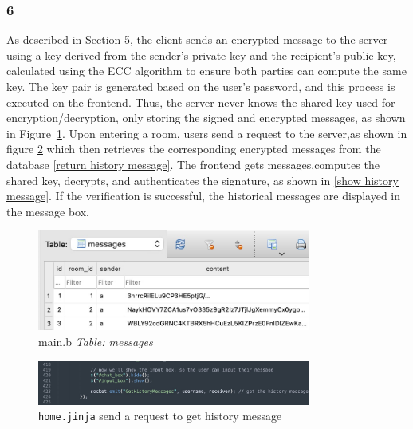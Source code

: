 \documentclass[12pt]{article}
\begin{document}
        \subsubsection*{6}
            As described in Section 5, the client sends an encrypted message to the server using a key derived from the sender's private key and the recipient's public key, calculated using the ECC algorithm to ensure both parties can compute the same key. The key pair is generated based on the user's password, and this process is executed on the frontend. Thus, the server never knows the shared key used for encryption/decryption, only storing the signed and encrypted messages, as shown in Figure~\ref{store history message}. Upon entering a room, users send a request to the server,as shown in figure \ref{get history message} which then retrieves the corresponding encrypted messages from the database \ref{return history message}. The frontend gets messages,computes the shared key, decrypts, and authenticates the signature, as shown in \ref{show history message}. If the verification is successful, the historical messages are displayed in the message box.

            \begin{figure}[H]
                \centering
                \includegraphics[width=0.8\textwidth]{graphs/store_history_message.jpg}
                \caption{main.b  \textit{Table: messages}}
                \label{store history message}
            \end{figure}

            \begin{figure}[H]
                \centering
                \includegraphics[width=0.8\textwidth]{graphs/join_room_get_history_message.jpg}
                \caption{\texttt{home.jinja} send a request to get history message}
                \label{get history message}
            \end{figure}
\end{document}
